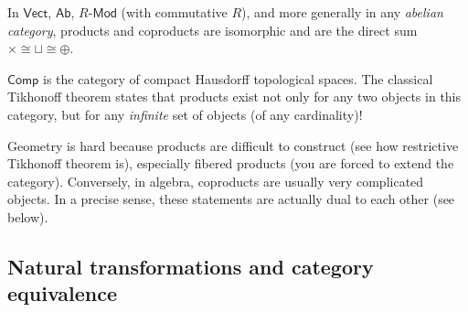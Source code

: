 \begin{example}
In $\mathsf{Vect}$, $\mathsf{Ab}$, $R\text{-}\mathsf{Mod}$ (with commutative $R$), and more generally in any \emph{abelian category}, products and coproducts are isomorphic and are the direct sum $\times\cong\sqcup\cong\oplus$.
\end{example}
%
\begin{example}
$\mathsf{Comp}$ is the category of compact Hausdorff topological
spaces. The classical Tikhonoff theorem states that products exist
not only for any two objects in this category, but for any \emph{infinite}
set of objects (of any cardinality)!
\end{example}
%
\begin{rem}
Geometry is hard because products are difficult to construct (see
how restrictive Tikhonoff theorem is), especially fibered products
(you are forced to extend the category). Conversely, in algebra, coproducts
are usually very complicated objects. In a precise sense, these statements
are actually dual to each other (see below).
\end{rem}



\subsection{Natural transformations and category equivalence}

